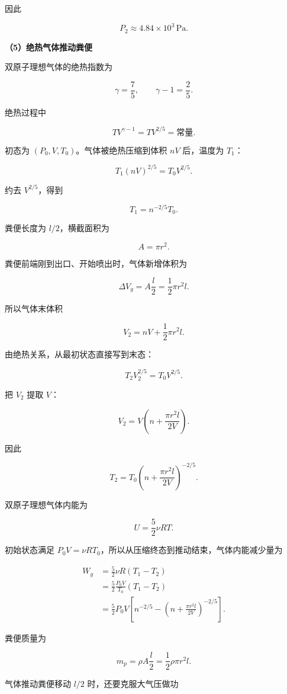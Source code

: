 \documentclass[12pt,a4paper,UTF8]{ctexart}
\begin{document}
因此

\[
\boxed{P_2\approx4.84\times10^3\,\mathrm{Pa}}.
\tag{19}
\]

\textbf{（5）绝热气体推动粪便}

双原子理想气体的绝热指数为

\[
\gamma=\frac75,
\qquad
\gamma-1=\frac25.
\]

绝热过程中

\[
TV^{\gamma-1}=TV^{2/5}=\text{常量}.
\tag{20}
\]

初态为 \((P_0,V,T_0)\)。气体被绝热压缩到体积 \(nV\) 后，温度为 \(T_1\)：

\[
T_1(nV)^{2/5}=T_0V^{2/5}.
\]

约去 \(V^{2/5}\)，得到

\[
\boxed{T_1=n^{-2/5}T_0}.
\tag{21}
\]

粪便长度为 \(l/2\)，横截面积为

\[
A=\pi r^2.
\]

粪便前端刚到出口、开始喷出时，气体新增体积为

\[
\Delta V_g=A\frac l2=\frac12\pi r^2l.
\]

所以气体末体积

\[
V_2=nV+\frac12\pi r^2l.
\]

由绝热关系，从最初状态直接写到末态：

\[
T_2V_2^{2/5}=T_0V^{2/5}.
\]

把 \(V_2\) 提取 \(V\)：

\[
V_2=V\left(n+\frac{\pi r^2l}{2V}\right).
\]

因此

\[
\boxed{
T_2=T_0\left(n+\frac{\pi r^2l}{2V}\right)^{-2/5}
}.
\tag{22}
\]

双原子理想气体内能为

\[
U=\frac52\nu RT.
\]

初始状态满足
\(P_0V=\nu RT_0\)，所以从压缩终态到推动结束，气体内能减少量为

\[
\begin{aligned}
W_g
&=\frac52\nu R(T_1-T_2)\\
&=\frac52\frac{P_0V}{T_0}(T_1-T_2)\\
&=\frac52P_0V\left[
n^{-2/5}
-\left(n+\frac{\pi r^2l}{2V}\right)^{-2/5}
\right].
\end{aligned}
\tag{23}
\]

粪便质量为

\[
m_p=\rho A\frac l2=\frac12\rho\pi r^2l.
\tag{24}
\]

气体推动粪便移动 \(l/2\) 时，还要克服大气压做功
\end{document}
